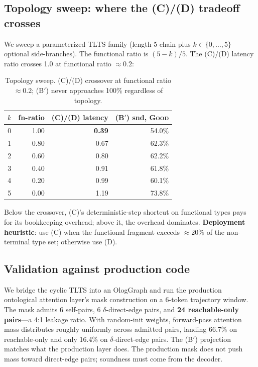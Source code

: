 \documentclass[preprint]{nesy2026}
\begin{document}
\subsection{Topology sweep: where the (C)/(D) tradeoff crosses}

We sweep a parameterized TLTS family (length-5 chain plus $k \in
\{0, \ldots, 5\}$ optional side-branches). The functional ratio is
$(5-k)/5$. The (C)/(D) latency ratio crosses 1.0 at functional ratio
$\approx 0.2$:

\begin{table}[h]
\centering
\small
\begin{tabular}{@{}rrrr@{}}
\toprule
$k$ & fn-ratio & (C)/(D) latency & (B$'$) snd, \textsc{Good} \\
\midrule
0 & 1.00 & \textbf{0.39} & 54.0\% \\
1 & 0.80 & 0.67 & 62.3\% \\
2 & 0.60 & 0.80 & 62.2\% \\
3 & 0.40 & 0.91 & 61.8\% \\
4 & 0.20 & 0.99 & 60.1\% \\
5 & 0.00 & 1.19 & 73.8\% \\
\bottomrule
\end{tabular}
\caption{Topology sweep. (C)/(D) crossover at functional ratio
$\approx 0.2$; (B$'$) never approaches 100\% regardless of topology.}
\label{tab:sweep}
\end{table}

Below the crossover, (C)'s deterministic-step shortcut on functional
types pays for its bookkeeping overhead; above it, the overhead
dominates. \textbf{Deployment heuristic}: use (C) when the
functional fragment exceeds $\approx 20\%$ of the non-terminal type
set; otherwise use (D).

\subsection{Validation against production code}
\label{ssec:real}

We bridge the cyclic TLTS into an OlogGraph and run the production
ontological attention layer's mask construction on a 6-token
trajectory window. The mask admits 6 self-pairs, 6 $\delta$-direct-edge
pairs, and \textbf{24 reachable-only pairs}---a 4:1 leakage ratio.
With random-init weights, forward-pass attention mass distributes
roughly uniformly across admitted pairs, landing 66.7\% on
reachable-only and only 16.4\% on $\delta$-direct-edge pairs. The
(B$'$) projection matches what the production layer does. The
production mask does not push mass toward direct-edge pairs;
soundness must come from the decoder.
\end{document}
